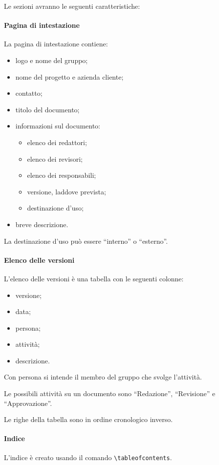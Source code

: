 \documentclass[a4paper, 12pt]{article}
\begin{document}
Le sezioni avranno le seguenti caratteristiche:

\paragraph{Pagina di intestazione}
La pagina di intestazione contiene:
\begin{itemize}
\item logo e nome del gruppo;
\item nome del progetto e azienda cliente;
\item contatto;
\item titolo del documento;
\item informazioni sul documento:
\begin{itemize}
	\item elenco dei redattori;
	\item elenco dei revisori;
	\item elenco dei responsabili;
	\item versione, laddove prevista;
	\item destinazione d'uso;
\end{itemize}
\item breve descrizione.
\end{itemize}

La destinazione d'uso può essere ``interno'' o ``esterno''.



\paragraph{Elenco delle versioni}
L'elenco delle versioni è una tabella con le seguenti colonne:
\begin{itemize}
\item versione;
\item data;
\item persona;
\item attività;
\item descrizione.
\end{itemize}

Con persona si intende il membro del gruppo che svolge l'attività.

Le possibili attività su un documento sono ``Redazione'', ``Revisione'' e ``Approvazione''.

Le righe della tabella sono in ordine cronologico inverso.

\paragraph{Indice}
L'indice è creato usando il comando \verb-\tableofcontents-.
\end{document}

